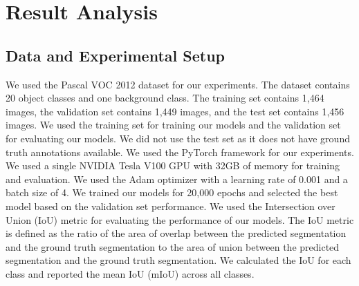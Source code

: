 
\chapter{Result Analysis}
\label{sec:result_analysis}





\section{Data and Experimental Setup}
\label{subsec: Data and Experimental setup}
We used the Pascal VOC 2012 dataset \cite{pascal_voc} for our experiments. The dataset contains 20 object classes and one background class. The training set contains 1,464 images, the validation set contains 1,449 images, and the test set contains 1,456 images. We used the training set for training our models and the validation set for evaluating our models. We did not use the test set as it does not have ground truth annotations available.
We used the PyTorch framework for our experiments. We used a single NVIDIA Tesla V100 GPU with 32GB of memory for training and evaluation. We used the Adam optimizer with a learning rate of 0.001 and a batch size of 4. We trained our models for 20,000 epochs and selected the best model based on the validation set performance.
We used the Intersection over Union (IoU) metric for evaluating the performance of our models. The IoU metric is defined as the ratio of the area of overlap between the predicted segmentation and the ground truth segmentation to the area of union between the predicted segmentation and the ground truth segmentation. We calculated the IoU for each class and reported the mean IoU (mIoU) across all classes.
